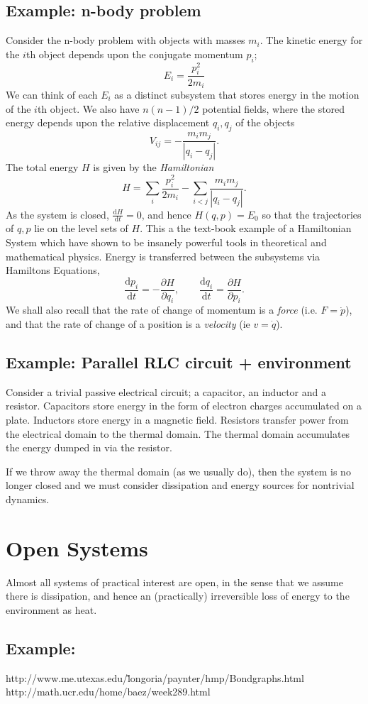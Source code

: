 \documentclass[11pt, a4paper]{amsart}
\newcommand{\D}[2]{\frac{\mathrm{d} #1}{\mathrm{d} #2}}
\renewcommand{\P}[2]{\frac{\partial #1}{\partial #2}}
\begin{document}
\subsection{Example: n-body problem}
Consider the n-body problem with objects with masses $m_i$.
The kinetic energy for the $i$th object depends upon the conjugate momentum $p_i$; 
\[
E_i = \frac{p_i^2}{2m_i}
\]
We can think of each $E_i$ as a distinct subsystem that stores energy in the motion of the $i$th object.
We also have $n(n-1)/2$ potential fields, where the stored energy depends upon the relative displacement $q_i, q_j$ of the objects
\[
V_{ij} = -\frac{m_im_j}{|q_i - q_j|}.
\]
The total energy $H$ is given by the \emph{Hamiltonian}
\[
H =  \sum_i\frac{p_i^2}{2m_i}  - \sum_{i<j}\frac{m_im_j}{|q_i - q_j|}.
\]
As the system is closed, $\D{H}{t} = 0$, and hence $H(q,p) = E_0$ so that the trajectories of $q,p$ lie on the level sets of $H$.
This a the text-book example of a Hamiltonian System which have shown to be insanely powerful tools in theoretical and mathematical physics.
Energy is transferred between the subsystems via Hamiltons Equations,
\[
\D{p_i}{t} = -\P{H}{q_i},
\qquad \D{q_i}{t} = \P{H}{p_i}.
\]
We shall also recall that the rate of change of momentum is a \emph{force} (i.e. $F = \dot{p}$), and that the rate of change of a position is a \emph{velocity} (ie $v = \dot{q}$).
\subsection{Example: Parallel RLC circuit + environment}
Consider a trivial passive electrical circuit; a capacitor, an inductor and a resistor.
Capacitors store energy in the form of electron charges accumulated on a plate.  
Inductors store energy in a magnetic field.
Resistors transfer power from the electrical domain to the thermal domain.
The thermal domain accumulates the energy dumped in via the resistor.

If we throw away the thermal domain (as we usually do), then the system is no longer closed and we must consider dissipation  and energy sources for nontrivial dynamics.
\section{Open Systems}
Almost all systems of practical interest are open, in the sense that we assume there is dissipation, and hence an (practically) irreversible loss of energy to the environment as heat. 
\subsection{Example:}

\begin{thebibliography}{2}
http://www.me.utexas.edu/\~longoria/paynter/hmp/Bondgraphs.html
 http://math.ucr.edu/home/baez/week289.html
\end{thebibliography}
	
\end{document}
